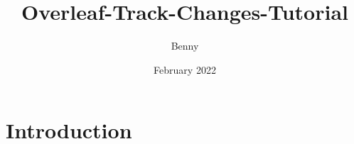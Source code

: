 \documentclass{article}
\title{Overleaf-Track-Changes-Tutorial}
\author{Benny}
\date{February 2022}
\begin{document}
\maketitle

\section{Introduction}
\end{document}
